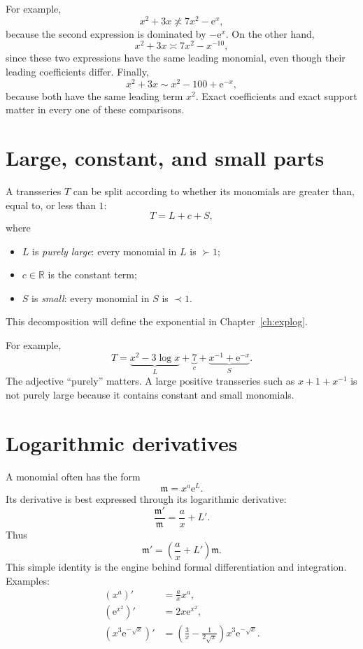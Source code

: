 \documentclass[11pt,openany]{book}
\theoremstyle{definition}
\theoremstyle{plain}
\theoremstyle{remark}
\newcommand{\R}{\mathbb{R}}
\newcommand{\m}{\mathfrak{m}}
\newcommand{\e}{\mathrm{e}}
\newcommand{\asym}{\sim}
\newcommand{\precdom}{\prec}
\newcommand{\succdom}{\succ}
\newcommand{\equivdom}{\asymp}
\begin{document}
For example,
\[
 x^2+3x\not\equivdom 7x^2-\e^x,
\]
because the second expression is dominated by $-\e^x$. On the other hand,
\[
 x^2+3x\equivdom 7x^2-x^{-10},
\]
since these two expressions have the same leading monomial, even though their
leading coefficients differ. Finally,
\[
 x^2+3x\asym x^2-100+\e^{-x},
\]
because both have the same leading term $x^2$. Exact coefficients and exact
support matter in every one of these comparisons.

\section{Large, constant, and small parts}

A transseries $T$ can be split according to whether its monomials are greater than, equal to, or less than $1$:
\begin{equation}\label{eq:additive-decomposition-preview}
 T=L+c+S,
\end{equation}
where
\begin{itemize}
\item $L$ is \emph{purely large}: every monomial in $L$ is $\succdom1$;
\item $c\in\R$ is the constant term;
\item $S$ is \emph{small}: every monomial in $S$ is $\precdom1$.
\end{itemize}
This decomposition will define the exponential in Chapter~\ref{ch:explog}.

For example,
\[
 T=\underbrace{x^2-3\log x}_{L}
   +\underbrace{7}_{c}
   +\underbrace{x^{-1}+\e^{-x}}_{S}.
\]
The adjective ``purely'' matters. A large positive transseries such as $x+1+x^{-1}$ is not purely large because it contains constant and small monomials.

\section{Logarithmic derivatives}

A monomial often has the form
\[
 \m=x^a\e^L.
\]
Its derivative is best expressed through its logarithmic derivative:
\begin{equation}\label{eq:log-derivative-monomial}
 \frac{\m'}{\m}=\frac{a}{x}+L'.
\end{equation}
Thus
\[
 \m'=\left(\frac{a}{x}+L'\right)\m.
\]
This simple identity is the engine behind formal differentiation and integration. Examples:
\begin{align*}
 (x^a)'&=\frac{a}{x}x^a,\\
 (\e^{x^2})'&=2x\e^{x^2},\\
 (x^3\e^{-\sqrt{x}})'&=
 \left(\frac3x-\frac1{2\sqrt{x}}\right)x^3\e^{-\sqrt{x}}.
\end{align*}
\end{document}
